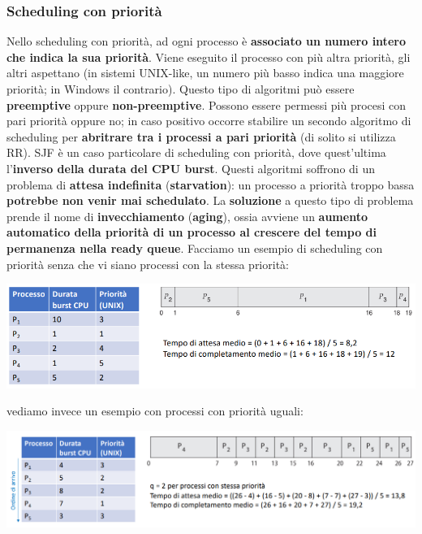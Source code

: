 \documentclass[12pt]{article}
\begin{document}
\subsubsection{Scheduling con priorità}
Nello scheduling con priorità, ad ogni processo è \textbf{associato un numero intero che indica la sua priorità}.
Viene eseguito il processo con più altra priorità, gli altri aspettano (in sistemi UNIX-like, un numero più basso indica una maggiore priorità; in Windows il contrario).
Questo tipo di algoritmi può essere \textbf{preemptive} oppure \textbf{non-preemptive}.
Possono essere permessi più procesi con pari priorità oppure no; in caso positivo occorre stabilire un secondo algoritmo di scheduling per \textbf{abritrare tra i processi a pari priorità} (di solito si utilizza RR).
SJF è un caso particolare di scheduling con priorità, dove quest'ultima l'\textbf{inverso della durata del CPU burst}.
Questi algoritmi soffrono di un problema di \textbf{attesa indefinita} (\textbf{starvation}): un processo a priorità troppo bassa \textbf{potrebbe non venir mai schedulato}.
La \textbf{soluzione} a questo tipo di problema prende il nome di \textbf{invecchiamento} (\textbf{aging}), ossia avviene un \textbf{aumento automatico della priorità di un processo al crescere del tempo di permanenza nella ready queue}.
Facciamo un esempio di scheduling con priorità senza che vi siano processi con la stessa priorità:
\begin{center}
    \includegraphics[width = 0.90\linewidth]{Images/49.png}
\end{center}
vediamo invece un esempio con processi con priorità uguali:
\begin{center}
    \includegraphics[width = 0.90\linewidth]{Images/50.png}
\end{center}
\end{document}
